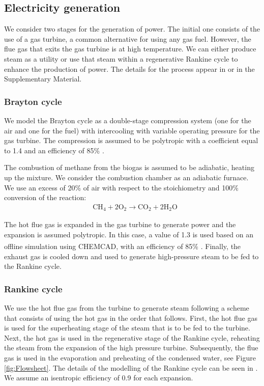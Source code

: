 \begin{refsection}[referencesCh2]
\subsection{Electricity generation} \label{section:ElectricityGeneration}
We consider two stages for the generation of power. The initial one consists of the use of a gas turbine, a common alternative for using any gas fuel. However, the flue gas that exits the gas turbine is at high temperature. We can either produce steam as a utility or use that steam within a regenerative Rankine cycle to enhance the production of power. The details for the process appear in \citet{Leon} or in the Supplementary Material.

\subsubsection{Brayton cycle}  \label{section:BraytonCycle}
We model the Brayton cycle as a double-stage compression system (one for the air and one for the fuel) with intercooling with variable operating pressure for the gas turbine. The compression is assumed to be polytropic with a coefficient equal to 1.4 and an efficiency of 85\% \citep{Moran2003}.

The combustion of methane from the biogas is assumed to be adiabatic, heating up the mixture. We consider the combustion chamber as an adiabatic furnace. We use an excess of 20\% of air with respect to the stoichiometry and 100\% conversion of the reaction:
\begin{align}
	& \text{CH}_4 + 2\text{O}_2 \rightarrow \text{CO}_2 + 2\text{H}_2 \text{O}
\end{align}

The hot flue gas is expanded in the gas turbine to generate power and the expansion is assumed polytropic. In this case, a value of 1.3 is used based on an offline simulation using CHEMCAD\textsuperscript{\textregistered}, with an efficiency of 85\% \citep{Moran2003}. Finally, the exhaust gas is cooled down and used to generate high-pressure steam to be fed to the Rankine cycle.

\subsubsection{Rankine cycle} \label{section:RankineCycle}
We use the hot flue gas from the turbine to generate steam following a scheme that consists of using the hot gas in the order that follows. First, the hot flue gas is used for the superheating stage of the steam that is to be fed to the turbine. Next, the hot gas is used in the regenerative stage of the Rankine cycle, reheating the steam from the expansion of the high pressure turbine. Subsequently, the flue gas is used in the evaporation and preheating of the condensed water, see Figure \ref{fig:Flowsheet}. The details of the modelling of the Rankine cycle can be seen in \citet{martin2013optimal}. We assume an isentropic efficiency of 0.9 for each expansion.


\end{refsection}
